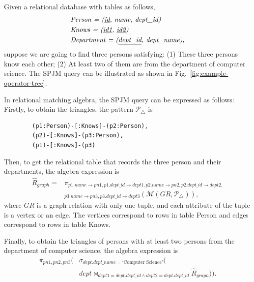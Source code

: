 {\begin{example}
    \label{example:framework}
    Given a relational database with tables as follows,
    \begin{equation*}
        \begin{split}
            & \textit{Person = (\underline{id}, name, dept\_id)} \\
            & \textit{Knows = (\underline{id1}, \underline{id2})} \\
            & \textit{Department = (\underline{dept\_id}, dept\_name)}, \\
        \end{split}
    \end{equation*}
    suppose we are going to find three persons satisfying:
    (1) These three persons know each other;
    (2) At least two of them are from the department of computer science.
    The SPJM query can be illustrated as shown in Fig.~\ref{fig:example-operator-tree}.

    In relational matching algebra, the SPJM query can be expressed as follows:
    Firstly, to obtain the triangles, the pattern $\mathcal{P}_{\triangle}$ is
    \begin{lstlisting}
        (p1:Person)-[:Knows]-(p2:Person),
        (p2)-[:Knows]-(p3:Person),
        (p1)-[:Knows]-(p3)
    \end{lstlisting}
    Then, to get the relational table that records the three person and their departments, the algebra expression is
    \begin{equation*}
        \begin{split}
            \widehat{R}_{graph} = & \pi_{p1.name\rightarrow pn1, p1.dept\_id \rightarrow dept1,p2.name\rightarrow pn2, p2.dept\_id \rightarrow dept2,} \\
            & _{p3.name\rightarrow pn3, p3.dept\_id \rightarrow dept3}(\mathcal{M}(GR, \mathcal{P}_{\triangle})),
        \end{split}
    \end{equation*}
    where $GR$ is a graph relation with only one tuple, and each attribute of the tuple is a vertex or an edge.
    The vertices correspond to rows in table Person and edges correspond to rows in table Knows.

    Finally, to obtain the triangles of persons with at least two persons from the department of computer science, the algebra expression is
    \begin{equation*}
        \begin{split}
        \pi_{pn1, pn2, pn3}
        (& \sigma_{dept.dept\_name = \text{`Computer Science'}}( \\
        & dept \Join_{dept1=dept.dept\_id \land dept2=dept.dept\_id} \widehat{R}_{graph})).
        \end{split}
    \end{equation*}


\end{example}}
